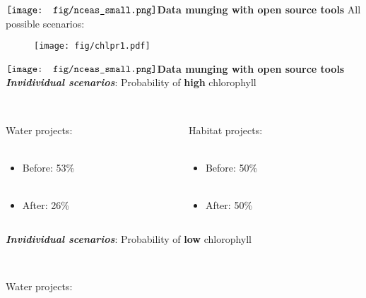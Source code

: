 \documentclass[serif]{beamer}\usepackage[]{graphicx}\usepackage[]{color}
\newcommand{\emtxt}[1]{\textbf{\textit{{\color{mypal4} #1}}}}
\begin{document}
\begin{frame}{{$\vcenter{\hbox{\texttt{[image: fig/nceas\_small.png]}}}$\hspace{0.07in}\textbf{Data munging with open source tools}}}
All possible scenarios:
\begin{figure}
\centering
\texttt{[image: fig/chlpr1.pdf]}
\end{figure}
\end{frame}



\begin{frame}{{$\vcenter{\hbox{\texttt{[image: fig/nceas\_small.png]}}}$\hspace{0.07in}\textbf{Data munging with open source tools}}}
\emtxt{Invidividual scenarios}: Probability of \textbf{high} chlorophyll\\~\\
\begin{columns}
\begin{column}{0.5\textwidth}
Water projects: \\~\\
\begin{itemize}
\item Before: 53\% \\~\\
\item After: 26\%
\end{itemize}
\end{column}
\begin{column}{0.5\textwidth}
Habitat projects: \\~\\
\begin{itemize}
\item Before: 50\% \\~\\
\item After: 50\%
\end{itemize}
\end{column}
\end{columns}
\vspace{0.2in}
\emtxt{Invidividual scenarios}: Probability of \textbf{low} chlorophyll\\~\\
\begin{columns}
\begin{column}{0.5\textwidth}
Water projects: \\~\\

\end{column}
\end{columns}
\end{frame}
\end{document}
